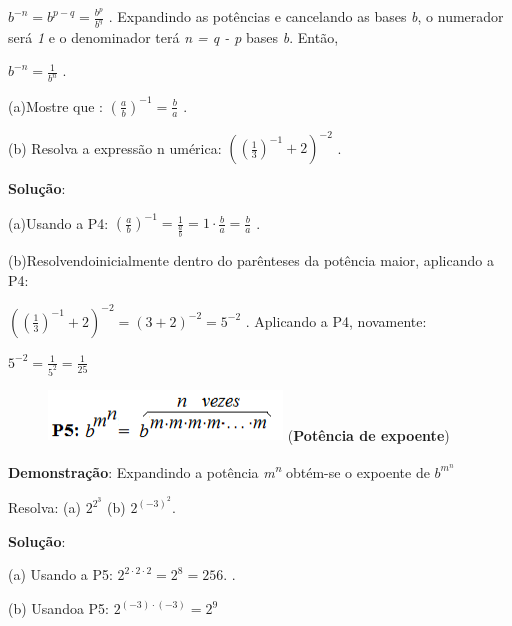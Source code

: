    \( b^{-n}=b^{p-q}=\frac{b^{p}}{b^{q}} \)  . Expandindo as potências e cancelando as bases \textit{b}, o numerador será \textit{1} e o denominador terá \textit{n = q - p} bases \textit{b}. Então,

 \( b^{-n}= \frac{1}{b^{n}} \) . \qedsymbol{}

\begin{texemplo}
    (a)Mostre que :    \(  \left( \frac{a}{b} \right) ^{-1}=\frac{b}{a} \) . 

   (b) Resolva a expressão n umérica:  \(  \left(  \left( \frac{1}{3} \right) ^{-1}+2 \right) ^{-2} \) .

\textbf{Solução}: 

 (a)Usando a P4:   \(  \left( \frac{a}{b} \right) ^{-1}=\frac{1}{\frac{a}{b}}=1 \cdot \frac{b}{a}=\frac{b}{a} \)  .

 (b)Resolvendoinicialmente dentro do parênteses da potência maior, aplicando a P4:   

  \(   \left(  \left( \frac{1}{3} \right) ^{-1}+2 \right) ^{-2}= \left( 3+2 \right) ^{-2}=5^{-2} \)  . Aplicando a P4, novamente:

  \( 5^{-2}=\frac{1}{5^{2}}=\frac{1}{25} \)   \qedsymbol{}
\end{texemplo}

\begin{caixa}
\begin{figure}[H]
    \begin{Center}
        \includegraphics[width=2.45in,height=0.53in]{capitulos/potencias_e_funcoes_exponenciais/media/image5.png}
        (\textbf{Potência de expoente})
	\end{Center}
\end{figure}
\end{caixa}

\textbf{Demonstração}: Expandindo a potência \textit{m\textsuperscript{n}} obtém-se o expoente de  \( b^{m^{n}} \)  \qedsymbol{}

\begin{texemplo}
Resolva: (a)  \( 2^{2^{3}} \)  (b)  $2^{(-3)^{2}}$.

\textbf{Solução}: 

 (a) Usando a P5:  \( 2^{2 \cdot 2 \cdot 2}=2^{8}=256. \)  .

 (b) Usandoa P5:   \( 2^{ \left( -3 \right)  \cdot  \left( -3 \right) }=2^{9} \)  \qedsymbol{}
\end{texemplo}

